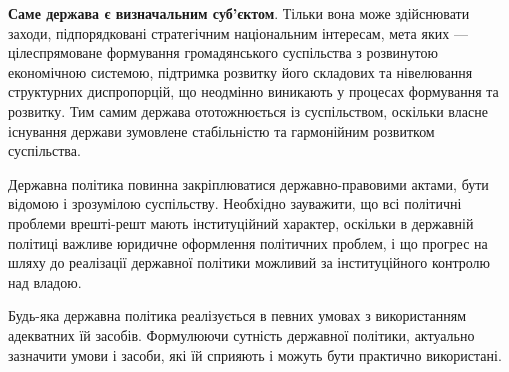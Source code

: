 \textbf{Саме держава є визначальним суб’єктом}. Тільки вона може здійснювати заходи, підпорядковані стратегічним національним інтересам, мета яких — цілеспрямоване формування громадянського суспільства з розвинутою економічною системою, підтримка розвитку його складових та нівелювання структурних диспропорцій, що неодмінно виникають у процесах формування та розвитку. Тим самим держава ототожнюється із суспільством, оскільки власне існування держави зумовлене стабільністю та гармонійним розвитком суспільства.

Державна політика повинна закріплюватися державно-правовими актами, бути відомою і зрозумілою суспільству. Необхідно зауважити, що всі політичні проблеми врешті-решт мають інституційний характер, оскільки в державній політиці важливе юридичне оформлення політичних проблем, і що прогрес на шляху до реалізації державної політики можливий за інституційного контролю над владою.

Будь-яка державна політика реалізується в певних умовах з використанням адекватних їй засобів. Формулюючи сутність державної політики, актуально зазначити умови і засоби, які їй сприяють і можуть бути практично використані.


